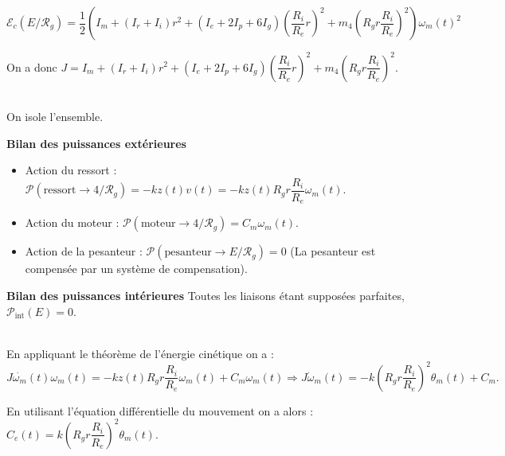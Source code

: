 \begin{multicols}{2}
\begin{corrige}
$$
\mathcal{E}_c\left(E/\mathcal{R}_g\right) =
\dfrac{1}{2}\left(
I_m
+\left(I_r+I_i\right)r^2
+\left(I_e+2I_p+6I_g\right)\left( \dfrac{R_i}{R_e}r\right)^2
+m_4\left( R_g r \dfrac{R_i}{R_e} \right)^2\right)\omega_m(t)^2
$$

On a donc $J=I_m
+\left(I_r+I_i\right)r^2
+\left(I_e+2I_p+6I_g\right)\left( \dfrac{R_i}{R_e}r\right)^2
+m_4\left( R_g r \dfrac{R_i}{R_e} \right)^2$.
\end{corrige}
\else
\fi


\ifprof
\begin{corrige} ~\\

On isole l'ensemble. 

\textbf{Bilan des puissances extérieures}
\begin{itemize}
\item Action du ressort : $\mathcal{P}\left(\text{ressort}\to 4/\mathcal{R}_g \right)=-kz(t)v(t)=-kz(t)R_g r \dfrac{R_i}{R_e}\omega_m(t)$.
\item Action du moteur : $\mathcal{P}\left(\text{moteur}\to 4/\mathcal{R}_g \right)=C_m\omega_m(t)$.
\item Action de la pesanteur : $\mathcal{P}\left(\text{pesanteur}\to E/\mathcal{R}_g \right)=0$ (La pesanteur est compensée par un système de compensation).
\end{itemize}

\textbf{Bilan des puissances intérieures}
Toutes les liaisons étant supposées parfaites, $\mathcal{P}_{\text{int}}\left(E\right)=0$.

\end{corrige}
\else
\fi


\ifprof
\begin{corrige} ~\\
En appliquant le théorème de l'énergie cinétique on a : 
$
J\dot{\omega_m}(t)\omega_m(t) = -kz(t)R_g r \dfrac{R_i}{R_e}\omega_m(t)+C_m\omega_m(t) \Rightarrow 
J\dot{\omega}_m(t) = -k \left(R_g r \dfrac{R_i}{R_e}\right)^2\theta_m(t) +C_m.
$

En utilisant l'équation différentielle du mouvement on a alors : 
$C_e(t) = k \left(R_g r \dfrac{R_i}{R_e}\right)^2\theta_m(t)$.
\end{corrige}
\else
\fi


\end{multicols}
